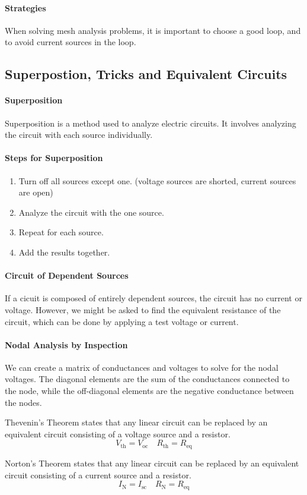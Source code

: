 \documentclass[11pt]{report}
\begin{document}
\paragraph{Strategies} When solving mesh analysis problems, it is important to choose a good loop, and to avoid current sources in the loop.
\subsection{Superpostion, Tricks and Equivalent Circuits}
\paragraph{Superposition} Superposition is a method used to analyze electric circuits. It involves analyzing the circuit with each source individually.
\paragraph{Steps for Superposition}
\begin{enumerate}
    \item Turn off all sources except one. (voltage sources are shorted, current sources are open)
    \item Analyze the circuit with the one source.
    \item Repeat for each source.
    \item Add the results together.
\end{enumerate}
\paragraph{Circuit of Dependent Sources} If a cicuit is composed of entirely dependent sources, the circuit has no current or voltage. However, we might be asked to find the equivalent resistance of the circuit, which can be done by applying a test voltage or current. 
\paragraph{Nodal Analysis by Inspection} We can create a matrix of conductances and voltages to solve for the nodal voltages. The diagonal elements are the sum of the conductances connected to the node, while the off-diagonal elements are the negative conductance between the nodes.
\begin{theorem}
    Thevenin's Theorem states that any linear circuit can be replaced by an equivalent circuit consisting of a voltage source and a resistor.
    \begin{equation}
        V_{\text{th}} = V_{\text{oc}} \quad R_{\text{th}} = R_{\text{eq}}
    \end{equation}
\end{theorem}
\begin{theorem}
    Norton's Theorem states that any linear circuit can be replaced by an equivalent circuit consisting of a current source and a resistor.
    \begin{equation}
        I_{\text{N}} = I_{\text{sc}} \quad R_{\text{N}} = R_{\text{eq}}
    \end{equation}
\end{theorem} 
\end{document}
